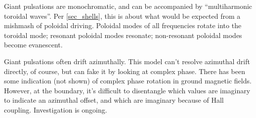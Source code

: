 Giant pulsations are monochromatic, and can be accompanied by ``multiharmonic toroidal waves''\cite{takahashi_2011}. Per \cref{sec_shells}, this is about what would be expected from a mishmash of poloidal driving. Poloidal modes of all frequencies rotate into the toroidal mode; resonant poloidal modes resonate; non-resonant poloidal modes become evanescent. 

Giant pulsations often drift azimuthally. This model can't resolve azimuthal drift directly, of course, but can fake it by looking at complex phase. There has been some indication (not shown) of complex phase rotation in ground magnetic fields. However, at the boundary, it's difficult to disentangle which values are imaginary to indicate an azimuthal offset, and which are imaginary because of Hall coupling. Investigation is ongoing. 
















